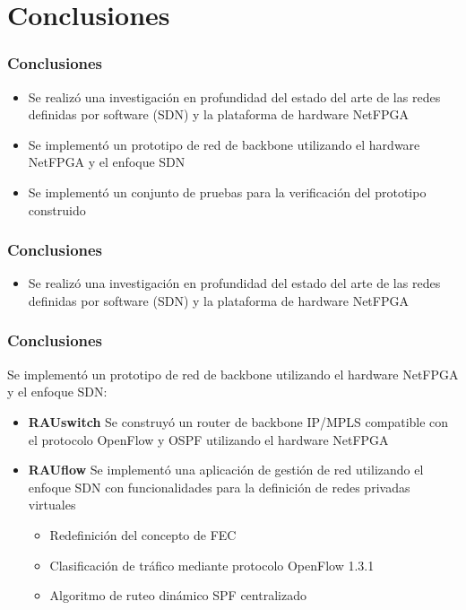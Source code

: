 \documentclass{beamer}
\begin{document}
\section{Conclusiones} 

\begin{frame}
\frametitle{Conclusiones} 

\begin{itemize}
\item Se realiz\'o una investigaci\'on en profundidad del estado del arte de las redes definidas por software (SDN) y la plataforma de hardware NetFPGA

\item Se implement\'o un prototipo de red de backbone utilizando el hardware NetFPGA y el enfoque SDN

\item Se implement\'o un conjunto de pruebas para la verificaci\'on del prototipo construido 

\end{itemize}
\end{frame}

\begin{frame}
\frametitle{Conclusiones} 

\begin{itemize}
\item Se realiz\'o una investigaci\'on en profundidad del estado del arte de las redes definidas por software (SDN) y la plataforma de hardware NetFPGA
\end{itemize}

\end{frame}


\begin{frame}
\frametitle{Conclusiones} 

Se implement\'o un prototipo de red de backbone utilizando el hardware NetFPGA y el enfoque SDN:

\begin{itemize}
\item \textbf{RAUswitch} Se construy\'o un router de backbone IP/MPLS compatible con el protocolo OpenFlow y OSPF utilizando el hardware NetFPGA

\item \textbf{RAUflow} Se implement\'o una aplicaci\'on de gesti\'on de red utilizando el enfoque SDN con funcionalidades para la definici\'on de redes privadas virtuales

\begin{itemize}
\item Redefinici\'on del concepto de FEC
\item Clasificaci\'on de tr\'afico mediante protocolo OpenFlow 1.3.1
\item Algoritmo de ruteo din\'amico SPF centralizado
\end{itemize}
\end{itemize}

\end{frame}
\end{document}
